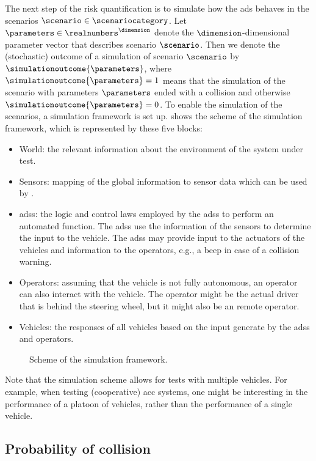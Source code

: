 The next step of the risk quantification is to simulate how the \ac{ads} behaves in the scenarios $\scenario\in\scenariocategory$. 
Let $\parameters\in\realnumbers^{\dimension}$ denote the $\dimension$-dimensional parameter vector that describes scenario $\scenario$. 
Then we denote the (stochastic) outcome of a simulation of scenario $\scenario$ by $\simulationoutcome{\parameters}$, where $\simulationoutcome{\parameters}=1$ means that the simulation of the scenario with parameters $\parameters$ ended with a collision and otherwise $\simulationoutcome{\parameters}=0$.
To enable the simulation of the scenarios, a simulation framework is set up.
 shows the scheme of the simulation framework, which is represented by these five blocks:
\begin{itemize}
	\item World: the relevant information about the environment of the system under test.
	\item Sensors: mapping of the global information to sensor data which can be used by . 
	\item \acp{ads}: the logic and control laws employed by the \acp{ads} to perform an automated function.
	The \acp{ads} use the information of the sensors to determine the input to the vehicle.
	The \acp{ads} may provide input to the actuators of the vehicles and information to the operators, e.g., a beep in case of a collision warning.
	\item Operators: assuming that the vehicle is not fully autonomous, an operator can also interact with the vehicle.
	The operator might be the actual driver that is behind the steering wheel, but it might also be an remote operator.
	\item Vehicles: the responses of all vehicles based on the input generate by the \acp{ads} and operators.
\end{itemize}

\begin{figure}
	\centering
	
	\caption{Scheme of the simulation framework.}
	\label{fig:simulation scheme}
\end{figure}

Note that the simulation scheme allows for tests with multiple vehicles.
For example, when testing (cooperative) \ac{acc} systems, one might be interesting in the performance of a platoon of vehicles, rather than the performance of a single vehicle.



\subsection{Probability of collision}
\label{sec:harmful}

